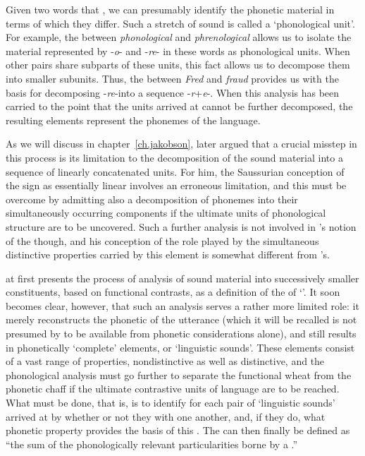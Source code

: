Given two words that , we can presumably identify the phonetic
material in terms of which they differ. Such a stretch of sound is
called a `phonological unit'. For example, the  between
\emph{phonological} and \emph{phrenological} allows us to isolate the
material represented by -\emph{o}- and -\emph{re}- in these words as
phonological units. When other pairs share subparts of these units,
this fact allows us to decompose them into smaller subunits. Thus, the
 between \emph{Fred} and \emph{fraud} provides us with the
basis for decomposing -\emph{re}-into a sequence
-\emph{r}+\emph{e}-. When this analysis has been carried to the point
that the units arrived at cannot be further decomposed, the resulting
elements represent the phonemes of the language.

As we will discuss in chapter~\ref{ch.jakobson}, {\Jakobson} later argued
that a crucial misstep in this process is its limitation to the
decomposition of the sound material into a sequence of linearly
concatenated units. For him, the Saussurian conception of the sign as
essentially linear involves an erroneous limitation, and this must be
overcome by admitting also a decomposition of phonemes into their
simultaneously occurring components if the ultimate units of
phonological structure are to be uncovered. Such a further analysis is
not involved in {\Trubetzkoy}'s notion of the  though, and his
conception of the role played by the simultaneous distinctive
properties carried by this element is somewhat different from
{\Jakobson}'s.

{\Trubetzkoy} at first presents the process of analysis of sound material
into successively smaller constituents, based on functional contrasts,
as a definition of the  of `'. It soon becomes clear,
however, that such an analysis serves a rather more limited role: it
merely reconstructs the phonetic  of the utterance (which
it will be recalled is not presumed by {\Trubetzkoy} to be available from
phonetic considerations alone), and still results in phonetically
`complete' elements, or `linguistic sounds'. These elements consist of
a vast range of properties, nondistinctive as well as distinctive, and
the phonological analysis must go further to separate the functional
wheat from the phonetic chaff if the ultimate contrastive units of
language are to be reached. What must be done, that is, is to identify
for each pair of `linguistic sounds' arrived at by 
whether or not they  with one another, and, if they do, what
phonetic property provides the basis of this . The  can
then finally be defined as ``the sum of the phonologically relevant
particularities borne by a .''

